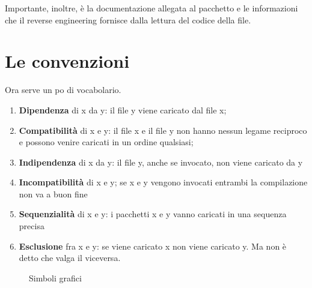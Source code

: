 Importante, inoltre, è la documentazione allegata al  pacchetto e le informazioni che il 
\foreignlanguage{english}{reverse engineering} fornisce dalla lettura del codice della file. 
\section{Le convenzioni}
 Ora serve un po di vocabolario. 
 \begin{enumerate}
 	\item \textbf{Dipendenza} di x da y: il file y viene caricato dal file x;
 	\item \textbf{Compatibilità} di x e y: il file x e il file y non hanno nessun legame reciproco e possono venire caricati in un ordine qualsiasi;
 	\item \textbf{Indipendenza} di x da y: il file y, anche se invocato, non viene caricato da y
 	\item \textbf{Incompatibilità} di x e y; se x e y vengono invocati entrambi la compilazione non va a buon fine
 	\item \textbf{Sequenzialità } di x e y: i pacchetti x e y vanno caricati in una sequenza precisa
 	\item \textbf{Esclusione} fra x e y: se viene caricato x non viene caricato y. Ma non è detto che valga il viceversa.
 \end{enumerate}
\begin{figure}
	\centering
	\captionsetup{name=Legenda}
	\caption{Simboli grafici}
	\label{fig:didascaliagrafici}
\end{figure}
